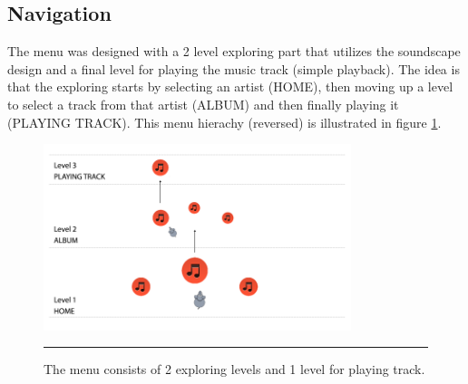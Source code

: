 \subsection{Navigation}
The menu was designed with a 2 level exploring part that utilizes the soundscape design and a final level for playing the music track (simple playback). The idea is that the exploring starts by selecting an artist (HOME), then moving up a level to select a track from that artist (ALBUM) and then finally playing it (PLAYING TRACK). This menu hierachy (reversed) is illustrated in figure \ref{fig:navigation}.

\begin{figure}[b]
	\centering
		\includegraphics[width=0.8\textwidth,height=\textheight,keepaspectratio]{./Figures/navigation.png}
		\rule{35em}{0.5pt}
	\caption[Menu Hierachy]{The menu consists of 2 exploring levels and 1 level for playing track.}
	\label{fig:navigation}
\end{figure}

